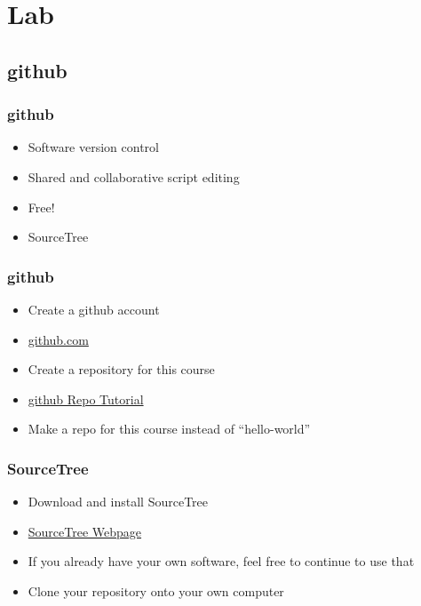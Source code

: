 \documentclass[14pt]{beamer}
\begin{document}
\section{Lab}

\subsection{github}

\begin{frame}
\frametitle{github}
\begin{itemize}
	\item Software version control
	\item Shared and collaborative script editing
	\item Free!
	\item SourceTree
\end{itemize}
\end{frame}

\begin{frame}
\frametitle{github}
\begin{itemize}
	\item Create a github account
	\item \href{https://github.com/}{github.com}
	\item Create a repository for this course
	\item \href{https://guides.github.com/activities/hello-world/}{github Repo Tutorial}
	\item Make a repo for this course instead of ``hello-world''
\end{itemize}
\end{frame}

\begin{frame}
\frametitle{SourceTree}
\begin{itemize}
	\item Download and install SourceTree
	\item \href{https://www.sourcetreeapp.com/}{SourceTree Webpage}
	\item If you already have your own software, feel free to continue to use that
	\item Clone your repository onto your own computer
\end{itemize}
\end{frame}
\end{document}
